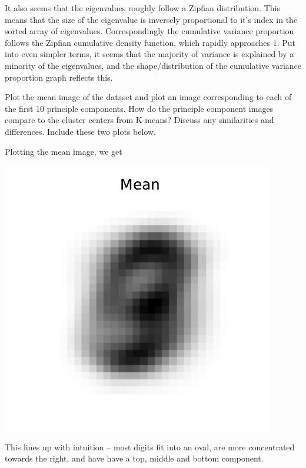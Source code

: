 \documentclass[expanded]{lkx_pset}
\begin{document}
\begin{parts}
	It also seems that the eigenvalues roughly follow a Zipfian distribution. This means that the size of the eigenvalue is inversely proportional to it's index in the sorted array of eigenvalues. Correspondingly the cumulative variance proportion follows the Zipfian cumulative density function, which rapidly approaches $1$. Put into even simpler terms, it seems that the majority of variance is explained by a minority of the eigenvalues, and the shape/distribution of the cumulative variance proportion graph reflects this.

	\begin{part}{2} Plot the mean image of the dataset and plot an image
		corresponding to each of the first 10 principle components.  How do
		the principle component images compare to the cluster centers from
		K-means? Discuss any similarities and differences.  Include these
		two plots below.
	\end{part}

	Plotting the mean image, we get
	\begin{center}
		\includegraphics[scale=0.7]{figures/p3_mean.pdf}
	\end{center}
	This lines up with intuition -- most digits fit into an oval, are more concentrated towards the right, and have have a top, middle and bottom component.


\end{parts}
\end{document}
